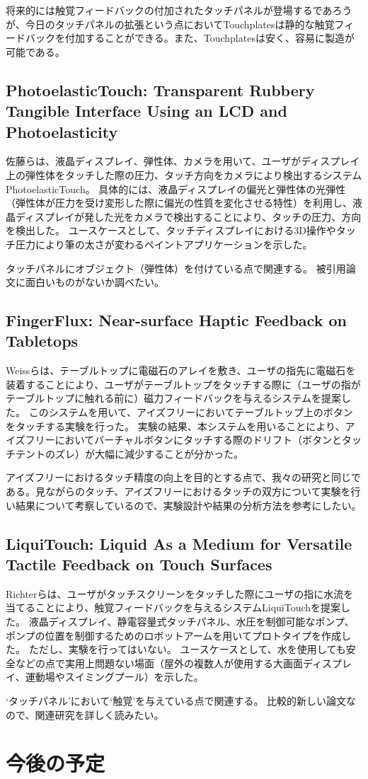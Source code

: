 \documentclass[11pt,a4paper]{jarticle}
\begin{document}
将来的には触覚フィードバックの付加されたタッチパネルが登場するであろうが、今日のタッチパネルの拡張という点においてTouchplatesは静的な触覚フィードバックを付加することができる。また、Touchplatesは安く、容易に製造が可能である。

\subsection{PhotoelasticTouch: Transparent Rubbery Tangible Interface Using an LCD and Photoelasticity\cite{Sato:2009}}
佐藤らは、液晶ディスプレイ、弾性体、カメラを用いて、ユーザがディスプレイ上の弾性体をタッチした際の圧力、タッチ方向をカメラにより検出するシステムPhotoelasticTouch。
具体的には、液晶ディスプレイの偏光と弾性体の光弾性（弾性体が圧力を受け変形した際に偏光の性質を変化させる特性）を利用し、液晶ディスプレイが発した光をカメラで検出することにより、タッチの圧力、方向を検出した。
ユースケースとして、タッチディスプレイにおける3D操作やタッチ圧力により筆の太さが変わるペイントアプリケーションを示した。

タッチパネルにオブジェクト（弾性体）を付けている点で関連する。
被引用論文に面白いものがないか調べたい。

\subsection{FingerFlux: Near-surface Haptic Feedback on Tabletops\cite{Weiss:2011}}
Weissらは、テーブルトップに電磁石のアレイを敷き、ユーザの指先に電磁石を装着することにより、ユーザがテーブルトップをタッチする際に（ユーザの指がテーブルトップに触れる前に）磁力フィードバックを与えるシステムを提案した。
このシステムを用いて、アイズフリーにおいてテーブルトップ上のボタンをタッチする実験を行った。
実験の結果、本システムを用いることにより、アイズフリーにおいてバーチャルボタンにタッチする際のドリフト（ボタンとタッチテントのズレ）が大幅に減少することが分かった。

アイズフリーにおけるタッチ精度の向上を目的とする点で、我々の研究と同じである。見ながらのタッチ、アイズフリーにおけるタッチの双方について実験を行い結果について考察しているので、実験設計や結果の分析方法を参考にしたい。

\subsection{LiquiTouch: Liquid As a Medium for Versatile Tactile Feedback on Touch Surfaces\cite{Richter:2013}}
Richterらは、ユーザがタッチスクリーンをタッチした際にユーザの指に水流を当てることにより、触覚フィードバックを与えるシステムLiquiTouchを提案した。
液晶ディスプレイ、静電容量式タッチパネル、水圧を制御可能なポンプ、ポンプの位置を制御するためのロボットアームを用いてプロトタイプを作成した。
ただし、実験を行ってはいない。
ユースケースとして、水を使用しても安全などの点で実用上問題ない場面（屋外の複数人が使用する大画面ディスプレイ、運動場やスイミングプール）を示した。

`タッチパネル'において`触覚'を与えている点で関連する。
比較的新しい論文なので、関連研究を詳しく読みたい。

\section{今後の予定}



\end{document}

